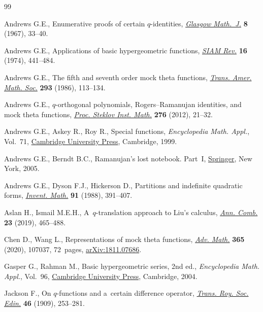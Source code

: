 \documentclass[10pt,a4paper]{amsart}
\numberwithin{equation}{section}
\begin{document}
\begin{thebibliography}{99}
\footnotesize\itemsep=0pt

Andrews G.E., Enumerative proofs of certain {$q$}-identities, \href{https://doi.org/10.1017/S0017089500000057}{\textit{Glasgow
 Math.~J.}} \textbf{8} (1967), 33--40.

Andrews G.E., Applications of basic hypergeometric functions, \href{https://doi.org/10.1137/1016081}{\textit{SIAM
 Rev.}} \textbf{16} (1974), 441--484.

Andrews G.E., The fifth and seventh order mock theta functions, \href{https://doi.org/10.2307/2000275}{\textit{Trans.
 Amer. Math. Soc.}} \textbf{293} (1986), 113--134.

Andrews G.E., {$q$}-orthogonal polynomials, {R}ogers--{R}amanujan identities,
 and mock theta functions, \href{https://doi.org/10.1134/S0081543812010038}{\textit{Proc. Steklov Inst. Math.}} \textbf{276}
 (2012), 21--32.

Andrews G.E., Askey R., Roy R., Special functions, \textit{Encyclopedia Math.
 Appl.}, Vol.~71, \href{https://doi.org/10.1017/CBO9781107325937}{Cambridge University Press}, Cambridge, 1999.

Andrews G.E., Berndt B.C., Ramanujan's lost notebook. {P}art~{I}, \href{https://doi.org/10.1007/0-387-28124-X}{Springer}, New
 York, 2005.

Andrews G.E., Dyson F.J., Hickerson D., Partitions and indefinite quadratic
 forms, \href{https://doi.org/10.1007/BF01388778}{\textit{Invent. Math.}} \textbf{91} (1988), 391--407.

Aslan H., Ismail M.E.H., A~{$q$}-translation approach to {L}iu's calculus,
 \href{https://doi.org/10.1007/s00026-019-00450-x}{\textit{Ann. Comb.}} \textbf{23} (2019), 465--488.

Chen D., Wang L., Representations of mock theta functions, \href{https://doi.org/10.1016/j.aim.2020.107037}{\textit{Adv. Math.}}
 \textbf{365} (2020), 107037, 72~pages, \href{https://arxiv.org/abs/1811.07686}{arXiv:1811.07686}.

Gasper G., Rahman M., Basic hypergeometric series, 2nd ed., \textit{Encyclopedia Math.
 Appl.}, Vol.~96, \href{https://doi.org/10.1017/CBO9780511526251}{Cambridge University Press}, Cambridge, 2004.

Jackson F., On $q$-functions and a~certain difference operator, \href{https://doi.org/10.1017/S0080456800002751}{\textit{Trans.
 Roy. Soc. Edin.}} \textbf{46} (1909), 253--281.


\end{thebibliography}
\end{document}
